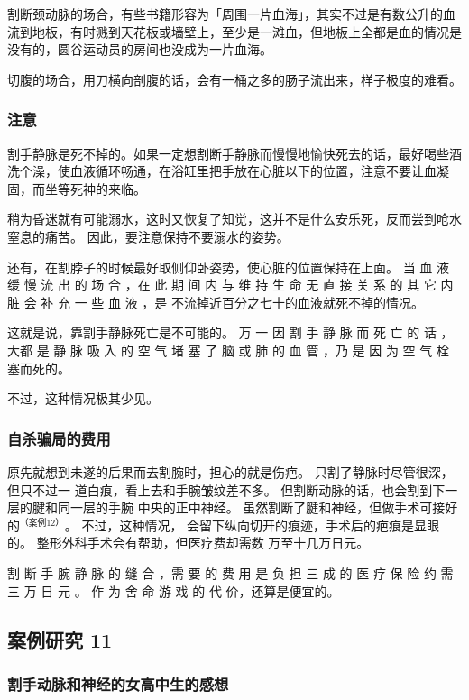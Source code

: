 \documentclass[UTF8]{ctexart}
\begin{document}
割断颈动脉的场合，有些书籍形容为「周围一片血海」，其实不过是有数公升的血流到地板，有时溅到天花板或墙壁上，至少是一滩血，但地板上全都是血的情况是没有的，圆谷运动员的房间也没成为一片血海。

切腹的场合，用刀横向剖腹的话，会有一桶之多的肠子流出来，样子极度的难看。

\subsubsection*{注意}

割手静脉是死不掉的。如果一定想割断手静脉而慢慢地愉快死去的话，最好喝些酒洗个澡，使血液循环畅通，在浴缸里把手放在心脏以下的位置，注意不要让血凝固，而坐等死神的来临。

稍为昏迷就有可能溺水，这时又恢复了知觉，这并不是什么安乐死，反而尝到呛水窒息的痛苦。
因此，要注意保持不要溺水的姿势。

还有，在割脖子的时候最好取侧仰卧姿势，使心脏的位置保持在上面。
当 血 液 缓 慢 流 出 的 场 合 ，在 此 期 间 内 与 维 持 生 命 无 直 接 关 系 的 其 它 内 脏 会 补 充 一 些 血 液 ，是 不流掉近百分之七十的血液就死不掉的情况。

这就是说，靠割手静脉死亡是不可能的。 
万 一 因 割 手 静 脉 而 死 亡 的 话 ，大都 是 静 脉 吸 入 的 空 气 堵 塞 了 脑 或 肺 的 血 管 ，乃 是 因 为 空 气 栓 塞而死的。

不过，这种情况极其少见。 

\subsubsection*{自杀骗局的费用}

原先就想到未遂的后果而去割腕时，担心的就是伤疤。
只割了静脉时尽管很深，但只不过一 道白痕，看上去和手腕皱纹差不多。
但割断动脉的话，也会割到下一层的腱和同一层的手腕 中央的正中神经。
虽然割断了腱和神经，但做手术可接好的$^{（案例 12）}$。
不过，这种情况， 会留下纵向切开的痕迹，手术后的疤痕是显眼的。
整形外科手术会有帮助，但医疗费却需数 万至十几万日元。

割 断 手 腕 静 脉 的 缝 合 ，需 要 的 费 用 是 负 担 三 成 的 医 疗 保 险 约 需 三 万 日 元 。
作 为 舍 命 游 戏 的 代 价，还算是便宜的。

\subsection{案例研究 11}
\subsubsection*{割手动脉和神经的女高中生的感想}
\end{document}
